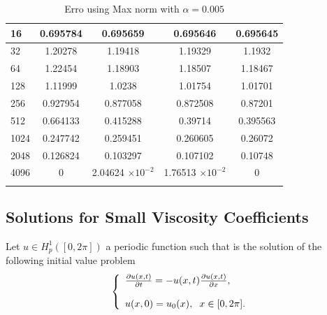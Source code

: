 \begin{table}[H]
\begin{tabular}{lcccc}
		\midrule
		\hspace{7mm} 16 & 0.695784 & 0.695659  & 0.695646  & 0.695645 \\
		\midrule
		\hspace{7mm} 32 & 1.20278  & 1.19418   & 1.19329   & 1.1932   \\
		\midrule
		\hspace{7mm} 64 & 1.22454  & 1.18903   & 1.18507   & 1.18467  \\
		\midrule
		\hspace{7mm} 128 & 1.11999  & 1.0238    & 1.01754   & 1.01701  \\
		\midrule
		\hspace{7mm} 256 & 0.927954 & 0.877058  & 0.872508  & 0.87201  \\
		\midrule
		\hspace{7mm} 512 & 0.664133 & 0.415288  & 0.39714   & 0.395563 \\
		\midrule
		\hspace{7mm} 1024 & 0.247742 & 0.259451  & 0.260605  & 0.26072  \\
		\midrule
		\hspace{7mm} 2048 & 0.126824 & 0.103297  & 0.107102  & 0.10748  \\
		\midrule
		\hspace{7mm} 4096 & 0        & 2.04624 $\times 10 ^{-2}$ & 1.76513  $\times 10 ^{-2}$ & 0        \\
		\\
		\bottomrule
	\end{tabular}
	\caption{Erro using Max norm with $\alpha=0.005$}
	\label{Collocation_tabla_max_alpha=005}
	\end{table}
	
	\newpage
	\subsection{Solutions for Small Viscosity Coefficients}
	Let $u \in H^1_p ([0,2 \pi])$ a periodic function such that is the solution of the following initial value problem
		\begin{align}
			\label{Inviscid}
			\left \lbrace \begin{array}{ll}
				\frac{\partial u(x, t)}{\partial t} = -u(x, t) \frac{\partial u(x, t)}{\partial x}, \\
				\\
				u(x, 0) = u_0(x), \hspace{2mm} x \in [0, 2 \pi].
			\end{array} \right .  
		\end{align}
		
